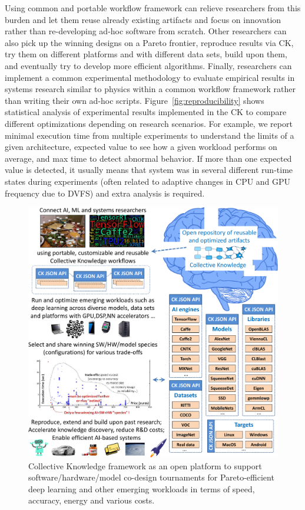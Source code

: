Using common and portable workflow framework can relieve researchers
from this burden and let them reuse already existing artifacts and
focus on innovation rather than re-developing ad-hoc software from scratch.
%
Other researchers can also pick up the winning designs on a Pareto frontier,
reproduce results via CK, try them on different platforms
and with different data sets, build upon them, 
and eventually try to develop more efficient algorithms.
%
Finally, researchers can implement a common experimental methodology 
to evaluate empirical results in systems research similar to physics 
within a common workflow framework rather than writing their own
ad-hoc scripts.
%
Figure~\ref{fig:reproducibility} shows statistical analysis 
of experimental results implemented in the CK to compare different
optimizations depending on research scenarios.
%
For example, we report minimal execution time from multiple experiments
to understand the limits of a given architecture, expected value to see
how a given workload performs on average, and max time to detect
abnormal behavior.
%
If more than one expected value is detected, it usually means
that system was in several different run-time states during experiments
(often related to adaptive changes in CPU and GPU frequency due to DVFS)
and extra analysis is required.

\begin{figure}[!htbp]
  \centering
   \includegraphics[width=4.5in]
   {ck-assets/b4b07ad3a7839327-cropped.pdf} %
  \caption{
    Collective Knowledge framework as an open platform to support software/hardware/model
    co-design tournaments for Pareto-efficient deep learning
    and other emerging workloads in terms of speed, accuracy, 
    energy and various costs.
  }
  \label{fig:reproducible-tournaments}
\end{figure}

